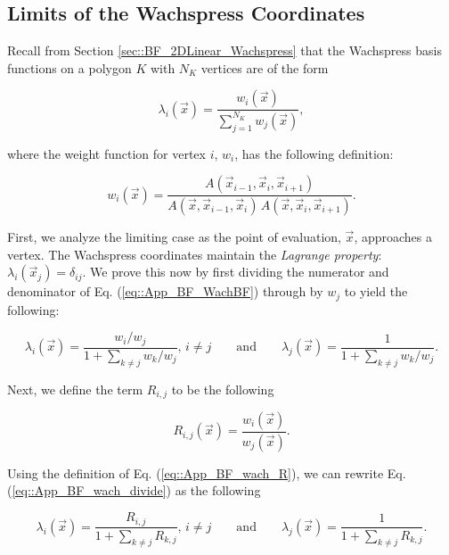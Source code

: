 \subsection{Limits of the Wachspress Coordinates}
\label{sec::appendix_BF_Limits_Wachspress}

Recall from Section \ref{sec::BF_2DLinear_Wachspress} that the Wachspress basis functions on a polygon $K$ with $N_K$ vertices are of the form

\begin{equation}
\label{eq::App_BF_WachBF}
\lambda_i (\vec{x}) = \frac{w_i  (\vec{x}) }{\sum\limits_{j=1}^{N_K} w_j  (\vec{x}) },
\end{equation}

\noindent where the weight function for vertex $i$, $w_i$, has the following definition:

\begin{equation}
\label{eq::App_BF_wach_weights}
w_i (\vec{x})  = \frac{A(\vec{x}_{i-1}, \vec{x}_{i}, \vec{x}_{i+1})}{A(\vec{x}, \vec{x}_{i-1}, \vec{x}_{i}) \, A(\vec{x}, \vec{x}_{i}, \vec{x}_{i+1})} .
\end{equation}

First, we analyze the limiting case as the point of evaluation, $\vec{x}$, approaches a vertex. The Wachspress coordinates maintain the {\em Lagrange property}: $\lambda_i (\vec{x}_j)=\delta_{ij}$. We prove this now by first dividing the numerator and denominator of Eq. (\ref{eq::App_BF_WachBF}) through by $w_j$ to yield the following:

\begin{equation}
\label{eq::App_BF_wach_divide}
\lambda_i (\vec{x}) = \frac{w_i/w_j}{1+\sum\limits_{k\neq j} w_k/w_j}, \, i \neq j \qquad \text{and} \qquad \lambda_j (\vec{x}) = \frac{1}{1+\sum\limits_{k\neq j} w_k/w_j} .
\end{equation}

\noindent Next, we define the term $R_{i,j}$ to be the following

\begin{equation}
\label{eq::App_BF_wach_R}
R_{i,j}(\vec{x}) = \frac{w_i (\vec{x})}{w_j (\vec{x})} .
\end{equation}

\noindent Using the definition of Eq. (\ref{eq::App_BF_wach_R}), we can rewrite Eq. (\ref{eq::App_BF_wach_divide}) as the following 

\begin{equation}
\label{eq::App_BF_wach_divideR}
\lambda_i (\vec{x}) = \frac{R_{i,j}}{1+\sum\limits_{k\neq j} R_{k,j}}, \, i \neq j \qquad \text{and} \qquad \lambda_j (\vec{x}) = \frac{1}{1+\sum\limits_{k\neq j} R_{k,j}} .
\end{equation}

